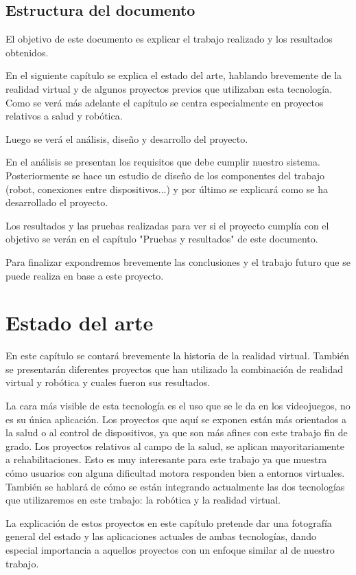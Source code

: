 \documentclass[twoside, 11pt]{epstfg}
\begin{document}
\section{Estructura del documento}


El objetivo de este documento es explicar el trabajo realizado y los resultados obtenidos.

En el siguiente capítulo se explica el estado del arte, hablando brevemente de la realidad virtual y de algunos proyectos previos que utilizaban esta tecnología. Como se verá más adelante el capítulo se centra especialmente en proyectos relativos a salud y robótica.

Luego se verá el análisis, diseño y desarrollo del proyecto.

En el análisis se presentan los requisitos que debe cumplir nuestro sistema. Posteriormente se hace un estudio de diseño de los componentes del trabajo (robot, conexiones entre dispositivos...) y por último se explicará como se ha desarrollado el proyecto.

Los resultados y las pruebas realizadas para ver si el proyecto cumplía con el objetivo se verán en el capítulo "Pruebas y resultados" de este documento.

Para finalizar expondremos brevemente las conclusiones y el trabajo futuro que se puede realiza en base a este proyecto.

\chapter{Estado del arte}


En este capítulo se contará brevemente la historia de la realidad virtual.
También se presentarán diferentes proyectos que han utilizado la combinación de realidad virtual y robótica y cuales fueron sus resultados.

La cara más visible de esta tecnología es el uso que se le da en los videojuegos, no es su única aplicación. Los proyectos que aquí se exponen están más orientados a la salud o al control de dispositivos, ya que son más afines con este trabajo fin de grado.
Los proyectos relativos al campo de la salud, se aplican mayoritariamente a rehabilitaciones. Esto es muy interesante para este trabajo ya que muestra cómo usuarios con alguna dificultad motora responden bien a entornos virtuales.
También se hablará de cómo se están integrando actualmente  las dos tecnologías que utilizaremos en este trabajo: la robótica y la realidad virtual.

La explicación de estos proyectos en este capítulo pretende dar una fotografía general del estado y las aplicaciones actuales de ambas tecnologías, dando especial importancia a aquellos proyectos con un enfoque similar al de nuestro trabajo.
\end{document}
